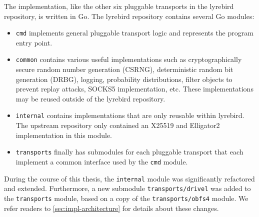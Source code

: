 The \drivel{} implementation, like the other six pluggable transports in the lyrebird repository, is written in Go. The lyrebird repository contains several Go modules:
\begin{itemize}
    \item \texttt{cmd} implements general pluggable transport logic and represents the program entry point.
    
    \item \texttt{common} contains various useful implementations such as cryptographically secure random number generation (CSRNG), deterministic random bit generation (DRBG), logging, probability distributions, filter objects to prevent replay attacks, SOCKS5 implementation, etc. These implementations may be reused outside of the lyrebird repository. 
    
    \item \texttt{internal} contains implementations that are only reusable within lyrebird. The upstream repository only contained an X25519 and \textsf{Elligator2}~\cite{CCS:BHKL13} implementation in this module.
    
    \item \texttt{transports} finally has submodules for each pluggable transport that each implement a common interface used by the \texttt{cmd} module. 
\end{itemize}

During the course of this thesis, the \texttt{internal} module was significantly refactored and extended. Furthermore, a new submodule \texttt{transports/drivel} was added to the \texttt{transports} module, based on a copy of the \texttt{transports/obfs4} module. We refer readers to \cref{sec:impl-architecture} for details about these changes.

